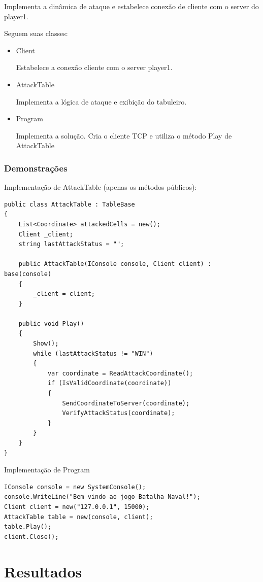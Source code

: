 \documentclass[
	12pt,				%
	oneside,			%
	a4paper,			%
	english,			%
	brazil,				%
	]{abntex2}
\begin{document}
{Implementa a dinâmica de ataque e estabelece conexão de cliente com o server do player1.

Seguem suas classes:
\begin{itemize}
    \item Client

    Estabelece a conexão cliente com o server player1.
    \item AttackTable

    Implementa a lógica de ataque e exibição do tabuleiro.
    \item Program

    Implementa a solução. Cria o cliente TCP e utiliza o método Play de AttackTable
\end{itemize}

\subsubsection{Demonstrações}

Implementação de AttackTable (apenas os métodos públicos):
\begin{lstlisting}
public class AttackTable : TableBase
{
    List<Coordinate> attackedCells = new();
    Client _client;
    string lastAttackStatus = "";

    public AttackTable(IConsole console, Client client) : base(console)
    {
        _client = client;
    }

    public void Play()
    {
        Show();
        while (lastAttackStatus != "WIN")
        {
            var coordinate = ReadAttackCoordinate();
            if (IsValidCoordinate(coordinate))
            {
                SendCoordinateToServer(coordinate);
                VerifyAttackStatus(coordinate);
            }
        }
    }
}
\end{lstlisting}

Implementação de Program
\begin{lstlisting}
IConsole console = new SystemConsole();
console.WriteLine("Bem vindo ao jogo Batalha Naval!");
Client client = new("127.0.0.1", 15000);
AttackTable table = new(console, client);
table.Play();
client.Close();
\end{lstlisting}

\section{Resultados}

}
\end{document}
